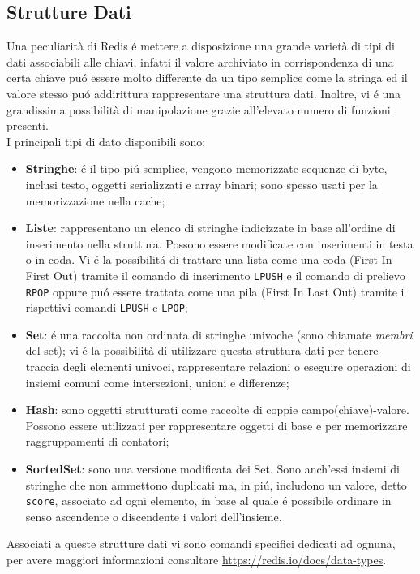 \subsection{Strutture Dati}
Una peculiarità di Redis é mettere a disposizione una grande varietà di tipi di dati associabili alle chiavi, infatti il valore archiviato
in corrispondenza di una certa chiave puó essere molto differente da un tipo semplice come la stringa ed il valore stesso puó addirittura
rappresentare una struttura dati. Inoltre, vi é una grandissima possibilità di manipolazione grazie all'elevato numero di funzioni presenti.\\
I principali tipi di dato disponibili sono:
\begin{itemize}
    \item \textbf{Stringhe}: é il tipo piú semplice, vengono memorizzate sequenze di byte, inclusi testo, oggetti serializzati e array binari;
    sono spesso usati per la memorizzazione nella cache;
    \item \textbf{Liste}: rappresentano un elenco di stringhe indicizzate in base all'ordine di inserimento nella struttura. Possono essere
    modificate con inserimenti in testa o in coda. Vi é la possibilitá di trattare una lista come una coda (First In First Out) tramite il comando di inserimento
    \texttt{LPUSH} e il comando di prelievo \texttt{RPOP} oppure puó essere trattata come una pila (First In Last Out) tramite i rispettivi comandi 
    \texttt{LPUSH} e \texttt{LPOP};
    \item \textbf{Set}: é una raccolta non ordinata di stringhe univoche (sono chiamate \emph{membri} del set); vi é la possibilità
    di utilizzare questa struttura dati per tenere traccia degli elementi univoci, rappresentare relazioni o eseguire operazioni di insiemi
    comuni come intersezioni, unioni e differenze;
    \item \textbf{Hash}: sono oggetti strutturati come raccolte di coppie campo(chiave)-valore. Possono essere utilizzati per rappresentare oggetti
    di base e per memorizzare raggruppamenti di contatori;
    \item \textbf{SortedSet}: sono una versione modificata dei Set. Sono anch'essi insiemi di stringhe che non ammettono duplicati ma, in piú,
    includono un valore, detto \texttt{score}, associato ad ogni elemento, in base al quale é possibile ordinare in senso ascendente o discendente i valori
    dell'insieme.
\end{itemize}
    Associati a queste strutture dati vi sono comandi specifici dedicati ad ognuna, per avere maggiori informazioni consultare
    \url{https://redis.io/docs/data-types}.

